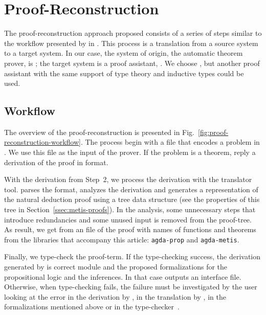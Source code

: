 \documentclass[../main.tex]{subfiles}
\begin{document}

\section{Proof-Reconstruction}
\label{sec:proof-reconstruction}

The proof-reconstruction approach proposed consists of a series
of steps similar to the workflow presented by \citeauthor{sultana2015} in
\cite{sultana2015}. This process is a translation from a source
system to a target system. In our case, the system of origin, the
automatic theorem prover, is \Metis; the target system is a proof
assistant, \Agda. We choose \Agda, but another proof assistant with the
same support of type theory and inductive types could be used.

\subsection{Workflow}
\label{ssec:workflow}


The overview of the proof-reconstruction is presented in
Fig.~\ref{fig:proof-reconstruction-workflow}. The process begin with
a \TPTP file that encodes a problem in \CPL. We use this file as the
input of the \Metis prover. If the problem is a theorem, \Metis
reply a derivation of the proof in \TSTP format.

With the \TSTP derivation from Step~2, we process the derivation with the
\Athena translator tool.
\Athena parses the \TSTP format, analyzes the
derivation and generates a representation of the natural deduction
proof using a tree data structure (see the properties
of this tree in Section~\ref{ssec:metis-proofs}).
In the \Athena analysis, some unnecessary steps that introduce redundancies
and some unused input is removed from the proof-tree.
As result, we get from \Athena an \Agda file of the proof
with names of functions and theorems from
the \Agda libraries that accompany this article:
\texttt{agda-prop} and \texttt{agda-metis}.

Finally, we type-check the \Agda proof-term. If the type-checking
success, the \TSTP derivation generated by \Metis is correct
module \Agda and the proposed formalizations for the
propositional logic and the \Metis inferences.
In that case \Agda outputs an interface file.
Otherwise, when type-checking fails, the failure must be
investigated by the user looking at the error in the \TSTP derivation
by \Metis, in the translation by \Athena, in the \Agda formalizations
mentioned above or in the type-checker~\Agda.
\end{document}
